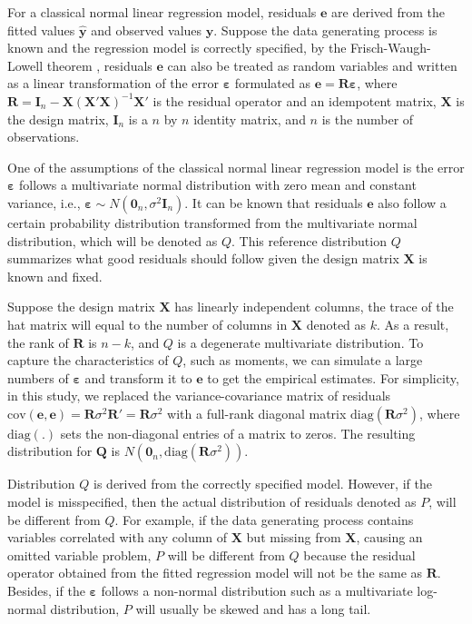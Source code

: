 \documentclass[]{interact}
\theoremstyle{plain}%
\theoremstyle{definition}
\theoremstyle{remark}
\begin{document}
For a classical normal linear regression model, residuals
\(\boldsymbol{e}\) are derived from the fitted values
\(\hat{\boldsymbol{y}}\) and observed values \(\boldsymbol{y}\). Suppose
the data generating process is known and the regression model is
correctly specified, by the Frisch-Waugh-Lowell theorem
\citep{frisch1933partial}, residuals \(\boldsymbol{e}\) can also be
treated as random variables and written as a linear transformation of
the error \(\boldsymbol{\varepsilon}\) formulated as
\(\boldsymbol{e} = \boldsymbol{R}\boldsymbol{\varepsilon}\), where
\(\boldsymbol{R}=\boldsymbol{I}_n -\boldsymbol{X}(\boldsymbol{X}'\boldsymbol{X})^{-1}\boldsymbol{X}'\)
is the residual operator and an idempotent matrix, \(\boldsymbol{X}\) is
the design matrix, \(\boldsymbol{I}_n\) is a \(n\) by \(n\) identity
matrix, and \(n\) is the number of observations.

One of the assumptions of the classical normal linear regression model
is the error \(\boldsymbol{\varepsilon}\) follows a multivariate normal
distribution with zero mean and constant variance, i.e.,
\(\boldsymbol{\varepsilon} \sim N(\boldsymbol{0}_n,\sigma^2\boldsymbol{I}_n)\).
It can be known that residuals \(\boldsymbol{e}\) also follow a certain
probability distribution transformed from the multivariate normal
distribution, which will be denoted as \(Q\). This reference
distribution \(Q\) summarizes what good residuals should follow given
the design matrix \(\boldsymbol{X}\) is known and fixed.

Suppose the design matrix \(\boldsymbol{X}\) has linearly independent
columns, the trace of the hat matrix will equal to the number of columns
in \(\boldsymbol{X}\) denoted as \(k\). As a result, the rank of
\(\boldsymbol{R}\) is \(n - k\), and \(Q\) is a degenerate multivariate
distribution. To capture the characteristics of \(Q\), such as moments,
we can simulate a large numbers of \(\boldsymbol{\varepsilon}\) and
transform it to \(\boldsymbol{e}\) to get the empirical estimates. For
simplicity, in this study, we replaced the variance-covariance matrix of
residuals
\(\text{cov}(\boldsymbol{e}, \boldsymbol{e}) = \boldsymbol{R}\sigma^2\boldsymbol{R}' = \boldsymbol{R}\sigma^2\)
with a full-rank diagonal matrix
\(\text{diag}(\boldsymbol{R}\sigma^2)\), where \(\text{diag}(.)\) sets
the non-diagonal entries of a matrix to zeros. The resulting
distribution for \(\boldsymbol{Q}\) is
\(N(\boldsymbol{0}_n, \text{diag}(\boldsymbol{R}\sigma^2))\).

Distribution \(Q\) is derived from the correctly specified model.
However, if the model is misspecified, then the actual distribution of
residuals denoted as \(P\), will be different from \(Q\). For example,
if the data generating process contains variables correlated with any
column of \(\boldsymbol{X}\) but missing from \(\boldsymbol{X}\),
causing an omitted variable problem, \(P\) will be different from \(Q\)
because the residual operator obtained from the fitted regression model
will not be the same as \(\boldsymbol{R}\). Besides, if the
\(\boldsymbol{\varepsilon}\) follows a non-normal distribution such as a
multivariate log-normal distribution, \(P\) will usually be skewed and
has a long tail.
\end{document}
